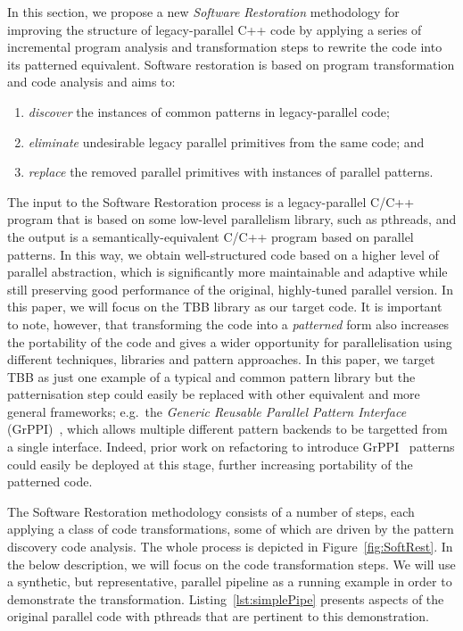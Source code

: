 \noindent
In this section, we propose a new \emph{Software Restoration} methodology %
for improving the structure of legacy-parallel C++ code by applying a series of incremental program analysis and transformation steps to rewrite the code into its patterned equivalent. %
Software restoration is based on program transformation and code analysis and aims to:
\begin{enumerate}
\item \emph{discover} the instances of common patterns in legacy-parallel code;
\item \emph{eliminate} undesirable  legacy parallel primitives from the same code; and
\item \emph{replace} the removed parallel primitives with instances of parallel patterns.
\end{enumerate}
\noindent
The input to the Software Restoration process is a legacy-parallel C/C++ program that is based on some low-level parallelism library, such as pthreads, and the output is a semantically-equivalent C/C++ program based on parallel patterns. In this way, we obtain well-structured code based on a higher level of parallel abstraction, which is significantly more maintainable and adaptive while still preserving
good performance of the original, highly-tuned parallel version. In this paper, we will focus on the TBB library as our target code. It is important to note, however, that transforming  the code into a \emph{patterned} form also increases the portability of the code and gives a wider opportunity for parallelisation using different techniques, libraries and pattern approaches. In this paper, we target TBB as just one example of a typical and common pattern library but the patternisation step could easily be replaced with other equivalent and more general frameworks; e.g.\ the \emph{Generic Reusable Parallel Pattern Interface} (GrPPI)~\cite{grppi}, which allows multiple different pattern backends to be targetted from a single interface. Indeed, prior work on refactoring to introduce GrPPI~\cite{grppirefac} patterns could easily be deployed at this stage, further increasing portability of the patterned code. 

The Software Restoration methodology consists of a number of steps, each applying a class of code transformations, some of which are driven by the pattern discovery code analysis.  The whole process is depicted in Figure~\ref{fig:SoftRest}. In the below description, we will focus on the code transformation steps. We will use a synthetic, but representative, parallel pipeline as a running example in order to demonstrate the transformation. Listing~\ref{lst:simplePipe} presents aspects of the original parallel code with pthreads that are pertinent to this demonstration.

